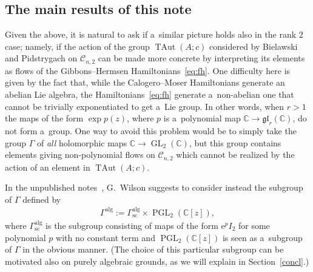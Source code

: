 \documentclass[11pt]{article}
\newcommand{\bb}[1]{\mathbb{#1}}
\DeclareMathOperator{\GL}{GL}
\DeclareMathOperator{\PGL}{PGL}
\DeclareMathOperator{\TAut}{TAut}
\begin{document}
\subsection{The main results of this note}

Given the above, it is natural to ask if a~similar picture holds also in the rank 2 case; namely, if the
action of the group \(\TAut(A;c)\) considered by Bielawski and Pidstrygach on \(\mathcal{C}_{n,2}\) can be
made more concrete by interpreting its elements as f\/lows of the Gibbons--Hermsen
Hamiltonians~\eqref{eq:fh}.
One dif\/f\/iculty here is given by the fact that, while the Calogero--Moser Hamiltonians generate an
abelian Lie algebra, the Hamiltonians~\eqref{eq:fh} generate a~non-abelian one that cannot be trivially
exponentiated to get a~Lie group.
In other words, when \(r>1\) the maps of the form \(\exp p(z)\), where \(p\) is a~polynomial map
\(\bb{C}\to \mathfrak{gl}_{r}(\bb{C})\), do not form a~group.
One way to avoid this problem would be to simply take the group \(\Gamma\) of \emph{all} holomorphic maps
\(\bb{C}\to \GL_{2}(\bb{C})\), but this group contains elements giving non-polynomial f\/lows on
\(\mathcal{C}_{n,2}\) which cannot be realized by the action of an element in \(\TAut(A;c)\).

In the unpublished notes~\cite{wils09}, G.~Wilson suggests to consider instead the subgroup of \(\Gamma\)
def\/ined by
\begin{gather}
\label{eq:def-Galg}
\Gamma^{\mathrm{alg}}\mathrel{:=}\Gamma^{\mathrm{alg}}_{\text{sc}}\times\PGL_{2}(\bb{C}[z]),
\end{gather}
where \(\Gamma^{\mathrm{alg}}_{\text{sc}}\) is the subgroup consisting of maps of the form \(\mathrm{e}^{p}
I_{2}\) for some polynomial \(p\) with no constant term and \(\PGL_{2}(\bb{C}[z])\) is seen as a~subgroup
of \(\Gamma\) in the obvious manner.
(The choice of this particular subgroup can be motivated also on purely algebraic grounds, as we will
explain in Section~\ref{concl}.)
\end{document}
